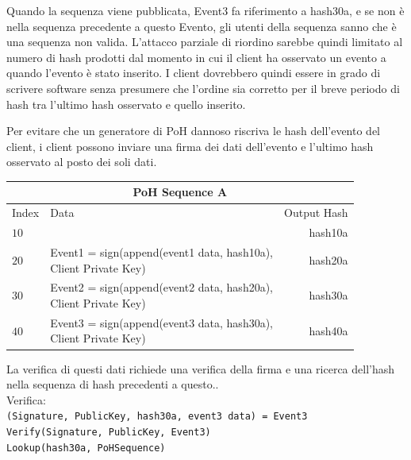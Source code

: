 \documentclass[12pt]{article}
\begin{document}
Quando la sequenza viene pubblicata, Event3 fa riferimento a hash30a, e se non è nella sequenza precedente a questo Evento, gli utenti della sequenza sanno che è una sequenza non valida. L'attacco parziale di riordino sarebbe quindi limitato al numero di hash prodotti dal momento in cui il client ha osservato un evento a quando l'evento è stato inserito. I client dovrebbero quindi essere in grado di scrivere software senza presumere che l'ordine sia corretto per il breve periodo di hash tra l'ultimo hash osservato e quello inserito.

Per evitare che un generatore di PoH dannoso riscriva le hash dell'evento del client, i client possono inviare una firma dei dati dell'evento e l'ultimo hash osservato al posto dei soli dati.\\
\begin{center}
  \begin{tabular}{  l  l  r }
    \multicolumn{3}{c}{PoH Sequence A} \\
    \hline
    Index & Data & Output Hash \\ \hline
    $10$ & & hash10a  \\
    $20$ & \makecell{Event1 = sign(append(event1 data, hash10a), \\Client Private Key)} & hash20a\\
    $30$ & \makecell{Event2 = sign(append(event2 data, hash20a), \\Client Private Key)} & hash30a \\
    $40$ & \makecell{Event3 = sign(append(event3 data, hash30a), \\Client Private Key)} & hash40a \\

    \end{tabular}
\end{center}

La verifica di questi dati richiede una verifica della firma e una ricerca dell'hash nella sequenza di hash precedenti a questo..\\
\noindent Verifica:\\

\noindent\texttt{(Signature, PublicKey, hash30a, event3 data) = Event3} \\
\texttt{Verify(Signature, PublicKey, Event3)} \\
\texttt{Lookup(hash30a, PoHSequence)} \\
\end{document}
